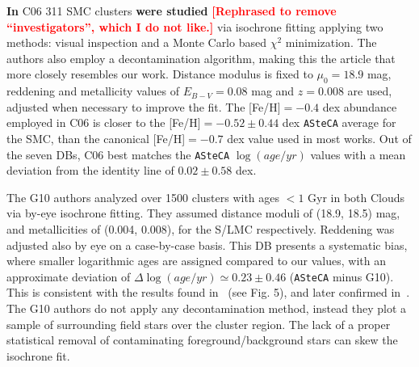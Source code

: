 \documentclass[draft]{aa}
\newcommand{\LEt}[1]{\textcolor{red}{\textbf{[#1]}}}
\begin{document}
%
\textbf{In} C06 311 SMC clusters \textbf{were studied} \LEt{Rephrased to remove
``investigators'', which I do not like.} via isochrone fitting
applying two methods: visual inspection and a Monte Carlo based $\chi^2$
minimization. The authors also employ a decontamination algorithm, making this
the article that more closely resembles our work.
Distance modulus is fixed to $\mu_0{=}18.9$ mag, reddening and
metallicity values of $E_{B-V}{=}0.08$ mag and $z{=}0.008$ are used, adjusted
when necessary to improve the fit.
The [Fe/H]${=}-0.4$ dex abundance employed in
C06 is closer to the [Fe/H]${=}-0.52{\pm}0.44$ dex \texttt{ASteCA} average
for the SMC, than the canonical [Fe/H]${=}-0.7$ dex value used in most works.
%
Out of the seven DBs, C06  best matches the \texttt{ASteCA}
$\log(age/yr)$ values with a mean deviation from the identity line of
$0.02\pm0.58$ dex.

%

The G10 authors analyzed over 1500 clusters with ages ${<}1$ Gyr in both Clouds
via by-eye isochrone fitting. They assumed distance moduli of (18.9, 18.5) mag,
and metallicities of (0.004, 0.008), for the S/LMC respectively. Reddening was
adjusted also by eye on a case-by-case basis.
This DB presents a systematic bias, where smaller logarithmic ages are
assigned compared to our values, with an approximate deviation of $\Delta
\log(age/yr){\simeq}0.23\pm0.46$ (\texttt{ASteCA} minus G10). This is consistent
with the results found in~\cite{Choudhury_2015} (see Fig. 5), and later
confirmed in~\cite{Piatti_2015a,Piatti_2015b}.
%
The G10 authors do not apply any decontamination method, instead they plot a
sample of surrounding field stars over the cluster region. The lack of a proper
statistical removal of contaminating foreground/background stars can
skew the isochrone fit.
\end{document}
